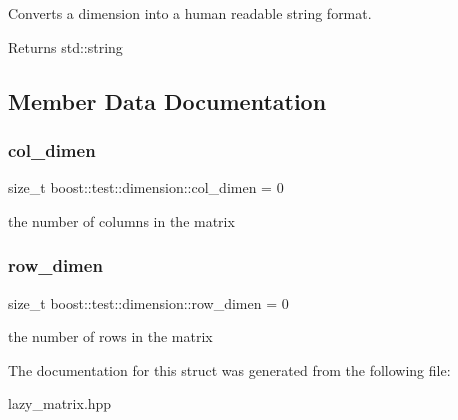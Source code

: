 Converts a dimension into a human readable string format. 

\begin{DoxyReturn}{Returns}
std\+::string 
\end{DoxyReturn}


\subsection{Member Data Documentation}
\mbox{\label{structboost_1_1test_1_1dimension_aec2eb72845bed9b2997eda3985305edf}} 
\subsubsection{\texorpdfstring{col\_dimen}{col\_dimen}}
{\footnotesize\ttfamily size\+\_\+t boost\+::test\+::dimension\+::col\+\_\+dimen = 0}



the number of columns in the matrix 

\mbox{\label{structboost_1_1test_1_1dimension_acd374bb986e34a3f0333b5a26770de0f}} 
\subsubsection{\texorpdfstring{row\_dimen}{row\_dimen}}
{\footnotesize\ttfamily size\+\_\+t boost\+::test\+::dimension\+::row\+\_\+dimen = 0}



the number of rows in the matrix 



The documentation for this struct was generated from the following file\+:\begin{DoxyCompactItemize}
\item 
lazy\+\_\+matrix.\+hpp\end{DoxyCompactItemize}
